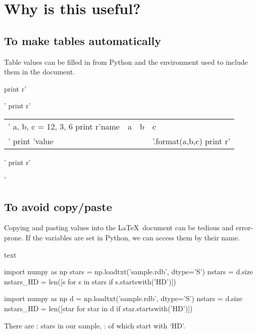 \documentclass{aa}
\begin{document}

\section{Why is this useful?}

  \subsection{To make tables automatically}

    Table values can be filled in from Python and the  environment used to include them in the document.

\begin{pycode}
print r'\begin{table}[h]'
print r'\begin{tabular}{l|lll}'
a, b, c = 12, 3, 6
print r'name & a & b & c \\'
print 'value & {} & {} & {}'.format(a,b,c)
print r'\end{tabular}'
print r'\end{table}'
\end{pycode}


  \subsection{To avoid copy/paste}

    Copying and pasting values into the \LaTeX\ document can be tedious and error-prone. If the variables are set in Python, we can access them by their name.

\begin{pygments}{text}
\begin{pycode}
import numpy as np
stars = np.loadtxt('sample.rdb', dtype='S')
nstars = d.size
nstars_HD = len([s for s in stars if s.startswith('HD')])
\end{pycode}
\end{pygments}

\begin{pycode}
import numpy as np
d = np.loadtxt('sample.rdb', dtype='S')
nstars = d.size
nstars_HD = len([star for star in d if star.startswith('HD')])
\end{pycode}

    There are : stars in our sample, : of which start with `HD'.
\end{document}
